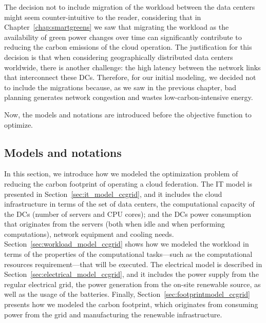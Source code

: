 The decision not to include migration of the workload between the data centers might seem counter-intuitive to the reader, considering that in Chapter~\ref{chap:smartgreens} we saw that migrating the workload as the availability of green power changes over time can significantly contribute to reducing the carbon emissions of the cloud operation. The justification for this decision is that when considering geographically distributed data centers worldwide, there is another challenge: the high latency between the network links that interconnect these DCs. Therefore, for our initial modeling, we decided not to include the migrations because, as we saw in the previous chapter, bad planning generates network congestion and wastes low-carbon-intensive energy.

Now, the models and notations are introduced before the objective function to optimize.

\subsection{Models and notations}
\label{sec:modelsnotations_ccgrid}

In this section, we introduce how we modeled the optimization problem of reducing the carbon footprint of operating a cloud federation. The IT model is presented in Section~\ref{sec:it_model_ccgrid}, and it includes the cloud infrastructure in terms of the set of data centers, the computational capacity of the DCs (number of servers and CPU cores); and the DCs power consumption that originates from the servers (both when idle and when performing computations), network equipment and  cooling needs. Section~\ref{sec:workload_model_ccgrid} shows how we modeled the workload in terms of the properties of the computational tasks---such as the computational resources requirement---that will be executed. The electrical model is described in Section~\ref{sec:electrical_model_ccgrid}, and it includes the power supply from the regular electrical grid, the power generation from the on-site renewable source, as well as the usage of the batteries. Finally, Section~\ref{sec:footprintmodel_ccgrid} presents how we modeled the carbon footprint, which originates from consuming power from the grid and manufacturing the renewable infrastructure.

